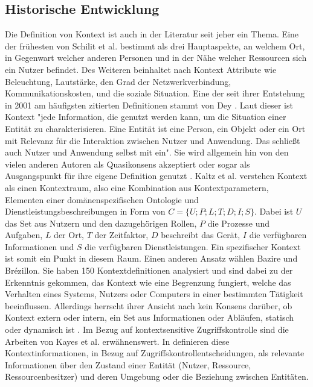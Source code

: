 \subsection{Historische Entwicklung}
Die Definition von Kontext ist auch in der Literatur seit jeher ein Thema. Eine der frühesten von Schilit et al. \cite{schilit_context-aware_1994} bestimmt als drei Hauptaspekte, an welchem Ort, in Gegenwart welcher anderen Personen und in der Nähe welcher Ressourcen sich ein Nutzer befindet. Des Weiteren beinhaltet nach \cite{schilit_context-aware_1994} Kontext Attribute wie Beleuchtung, Lautstärke, den Grad der Netzwerkverbindung, Kommunikationskosten, und die soziale Situation. Eine der seit ihrer Entstehung in 2001 am häufigsten zitierten Definitionen stammt von Dey \cite{dey_understanding_2001}. Laut dieser ist Kontext "jede Information, die genutzt werden kann, um die Situation einer Entität zu charakterisieren. Eine Entität ist eine Person, ein Objekt oder ein Ort mit Relevanz für die Interaktion zwischen Nutzer und Anwendung. Das schließt auch Nutzer und Anwendung selbst mit ein". Sie wird allgemein hin von den vielen anderen Autoren als Quasikonsens akzeptiert \cite{aguilar_cameonto_2018,alegre_engineering_2016,wei_liu_survey_2011} oder sogar als Ausgangspunkt für ihre eigene Definition genutzt \cite{kayes_icaf_2012, kokinov_operational_2007}. Kaltz et al. \cite{wolfgang_kaltz_context-aware_2005} verstehen Kontext als einen Kontextraum, also eine Kombination aus Kontextparametern, Elementen einer domänenspezifischen Ontologie und Dienstleistungsbeschreibungen in Form von $C = \{U;P;L;T;D;I;S\}$. Dabei ist $U$ das Set aus Nutzern und den dazugehörigen Rollen, $P$ die Prozesse und Aufgaben,  $L$ der Ort,  $T$ der Zeitfaktor,  $D$ beschreibt das Gerät, $I$ die verfügbaren Informationen und $S$ die verfügbaren Dienstleistungen. Ein spezifischer Kontext ist somit ein Punkt in diesem Raum. Einen anderen Ansatz wählen Bazire und Brézillon. Sie haben 150 Kontextdefinitionen analysiert und sind dabei zu der Erkenntnis gekommen, das Kontext wie eine Begrenzung fungiert, welche das Verhalten eines Systems, Nutzers oder Computers in einer bestimmten Tätigkeit beeinflussen. Allerdings herrscht ihrer Ansicht nach kein Konsens  darüber, ob Kontext extern oder intern, ein Set aus Informationen oder Abläufen, statisch oder dynamisch ist  \cite{hutchison_understanding_2005}. Im Bezug auf kontextsensitive Zugriffskontrolle sind die Arbeiten von Kayes et al. \cite{kayes_icaf_2012,kayes_survey_2020,kayes_ontological_2015} erwähnenswert. In \cite{kayes_icaf_2012} definieren diese Kontextinformationen, in Bezug auf Zugriffskontrollentscheidungen, als relevante Informationen über den Zustand einer Entität (Nutzer, Ressource, Ressourcenbesitzer) und deren Umgebung oder die Beziehung zwischen Entitäten.
